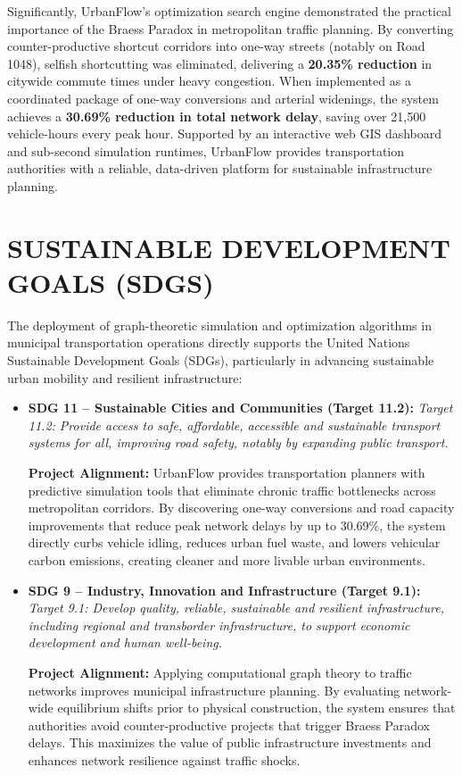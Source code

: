 \documentclass[12pt,a4paper]{report}
\begin{document}
Significantly, UrbanFlow's optimization search engine demonstrated the practical importance of the Braess Paradox in metropolitan traffic planning. By converting counter-productive shortcut corridors into one-way streets (notably on Road 1048), selfish shortcutting was eliminated, delivering a \textbf{20.35\% reduction} in citywide commute times under heavy congestion. When implemented as a coordinated package of one-way conversions and arterial widenings, the system achieves a \textbf{30.69\% reduction in total network delay}, saving over 21,500 vehicle-hours every peak hour. Supported by an interactive web GIS dashboard and sub-second simulation runtimes, UrbanFlow provides transportation authorities with a reliable, data-driven platform for sustainable infrastructure planning.

\chapter{SUSTAINABLE DEVELOPMENT GOALS (SDGS)}
\label{chap:sdgs}
The deployment of graph-theoretic simulation and optimization algorithms in municipal transportation operations directly supports the United Nations Sustainable Development Goals (SDGs), particularly in advancing sustainable urban mobility and resilient infrastructure:

\begin{itemize}
    \item \textbf{SDG 11 -- Sustainable Cities and Communities (Target 11.2):}
    \textit{Target 11.2: Provide access to safe, affordable, accessible and sustainable transport systems for all, improving road safety, notably by expanding public transport.}
    
    \textbf{Project Alignment:} UrbanFlow provides transportation planners with predictive simulation tools that eliminate chronic traffic bottlenecks across metropolitan corridors. By discovering one-way conversions and road capacity improvements that reduce peak network delays by up to 30.69\%, the system directly curbs vehicle idling, reduces urban fuel waste, and lowers vehicular carbon emissions, creating cleaner and more livable urban environments.

    \item \textbf{SDG 9 -- Industry, Innovation and Infrastructure (Target 9.1):}
    \textit{Target 9.1: Develop quality, reliable, sustainable and resilient infrastructure, including regional and transborder infrastructure, to support economic development and human well-being.}
    
    \textbf{Project Alignment:} Applying computational graph theory to traffic networks improves municipal infrastructure planning. By evaluating network-wide equilibrium shifts prior to physical construction, the system ensures that authorities avoid counter-productive projects that trigger Braess Paradox delays. This maximizes the value of public infrastructure investments and enhances network resilience against traffic shocks.
\end{itemize}
\end{document}

